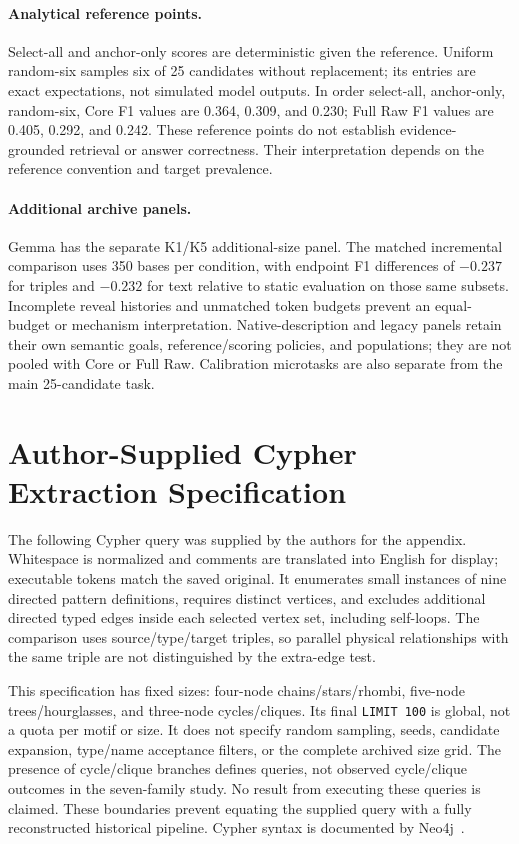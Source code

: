 \paragraph{Analytical reference points.}
Select-all and anchor-only scores are deterministic given the reference. Uniform random-six samples six of 25 candidates without replacement; its entries are exact expectations, not simulated model outputs. In order select-all, anchor-only, random-six, Core F1 values are 0.364, 0.309, and 0.230; Full Raw F1 values are 0.405, 0.292, and 0.242. These reference points do not establish evidence-grounded retrieval or answer correctness. Their interpretation depends on the reference convention and target prevalence.

\paragraph{Additional archive panels.}
Gemma has the separate K1/K5 additional-size panel. The matched incremental comparison uses 350 bases per condition, with endpoint F1 differences of $-0.237$ for triples and $-0.232$ for text relative to static evaluation on those same subsets. Incomplete reveal histories and unmatched token budgets prevent an equal-budget or mechanism interpretation. Native-description and legacy panels retain their own semantic goals, reference/scoring policies, and populations; they are not pooled with Core or Full Raw. Calibration microtasks are also separate from the main 25-candidate task.

\section{Author-Supplied Cypher Extraction Specification}
\label{app:cypher}
The following Cypher query was supplied by the authors for the appendix. Whitespace is normalized and comments are translated into English for display; executable tokens match the saved original. It enumerates small instances of nine directed pattern definitions, requires distinct vertices, and excludes additional directed typed edges inside each selected vertex set, including self-loops. The comparison uses source/type/target triples, so parallel physical relationships with the same triple are not distinguished by the extra-edge test.

This specification has fixed sizes: four-node chains/stars/rhombi, five-node trees/hourglasses, and three-node cycles/cliques. Its final \texttt{LIMIT 100} is global, not a quota per motif or size. It does not specify random sampling, seeds, candidate expansion, type/name acceptance filters, or the complete archived size grid. The presence of cycle/clique branches defines queries, not observed cycle/clique outcomes in the seven-family study. No result from executing these queries is claimed. These boundaries prevent equating the supplied query with a fully reconstructed historical pipeline. Cypher syntax is documented by Neo4j~\cite{neo4jCypher}.

